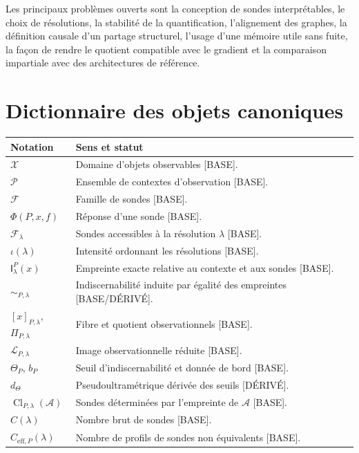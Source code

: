 \documentclass[11pt,a4paper]{article}
\theoremstyle{remark}
\newcommand{\X}{\mathcal X}
\newcommand{\Pctx}{\mathcal P}
\newcommand{\F}{\mathcal F}
\newcommand{\Cl}{\operatorname{Cl}}
\newcommand{\Emp}{\mathsf I}
\begin{document}
Les principaux problèmes ouverts sont la conception de sondes interprétables, le choix de résolutions, la stabilité de la quantification, l'alignement des graphes, la définition causale d'un partage structurel, l'usage d'une mémoire utile sans fuite, la façon de rendre le quotient compatible avec le gradient et la comparaison impartiale avec des architectures de référence.

\section{Dictionnaire des objets canoniques}

\begin{longtable}{p{}p{}}
\toprule
\textbf{Notation} & \textbf{Sens et statut}\\
\midrule
$\X$ & Domaine d'objets observables [BASE].\\
$\Pctx$ & Ensemble de contextes d'observation [BASE].\\
$\F$ & Famille de sondes [BASE].\\
$\Phi(P,x,f)$ & Réponse d'une sonde [BASE].\\
$\F_\lambda$ & Sondes accessibles à la résolution $\lambda$ [BASE].\\
$\iota(\lambda)$ & Intensité ordonnant les résolutions [BASE].\\
$\Emp_\lambda^P(x)$ & Empreinte exacte relative au contexte et aux sondes [BASE].\\
$\sim_{P,\lambda}$ & Indiscernabilité induite par égalité des empreintes [BASE/DÉRIVÉ].\\
$[x]_{P,\lambda}$, $\Pi_{P,\lambda}$ & Fibre et quotient observationnels [BASE].\\
$\mathcal L_{P,\lambda}$ & Image observationnelle réduite [BASE].\\
$\Theta_P$, $b_P$ & Seuil d'indiscernabilité et donnée de bord [BASE].\\
$d_\Theta$ & Pseudoultramétrique dérivée des seuils [DÉRIVÉ].\\
$\Cl_{P,\lambda}(\mathcal A)$ & Sondes déterminées par l'empreinte de $\mathcal A$ [BASE].\\
$C(\lambda)$ & Nombre brut de sondes [BASE].\\
$C_{\mathrm{eff},P}(\lambda)$ & Nombre de profils de sondes non équivalents [BASE].\\

\end{longtable}
\end{document}
